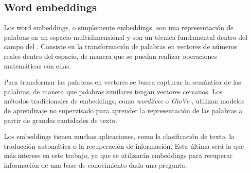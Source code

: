 \subsection{Word embeddings}
Los word embeddings, o simplemente embeddings, son una representación de palabras en un espacio multidimensional y son un técnica fundamental dentro del campo del . Consiste en la transformación de palabras en vectores de números reales dentro del espacio, de manera que se puedan realizar operaciones matemáticas con ellas.

Para transformar las palabras en vectores se busca capturar la semántica de las palabras, de manera que palabras similares tengan vectores cercanos. Los métodos tradicionales de embeddings, como \textit{word2vec} \cite{mikolov2013efficient} o \textit{GloVe} \cite{pennington2014glove}, utilizan modelos de aprendizaje no supervisado para aprender la representación de las palabras a partir de grandes cantidades de texto.

Los embeddings tienen muchas aplicaciones, como la clasificación de texto, la traducción automática o la recuperación de información. Esta última será la que más interese en este trabajo, ya que se utilizarán embeddings para recuperar información de una base de conocimiento dada una pregunta.